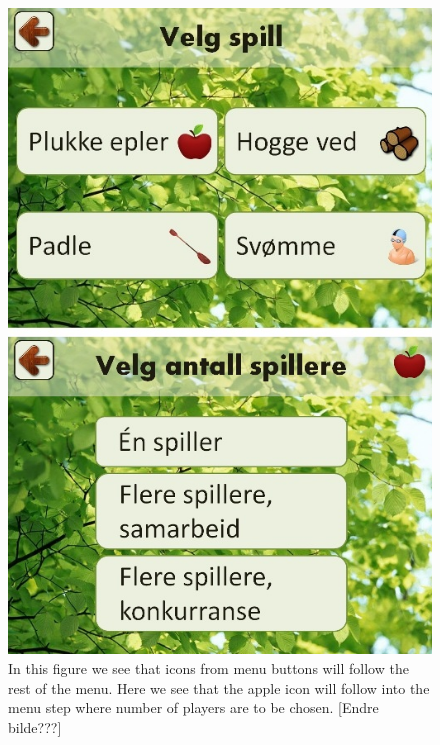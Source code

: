 \begin{figure} [H]
\centering
\includegraphics[scale=0.5]{IconEple.jpg}
\caption[Menu - use of icons]{In this figure we see that icons from menu buttons will follow the rest of the menu. Here we see that the apple icon will follow into the menu step where number of players are to be chosen. [Endre bilde???]}
\label{fig:iconEple}
\end{figure} 
     
